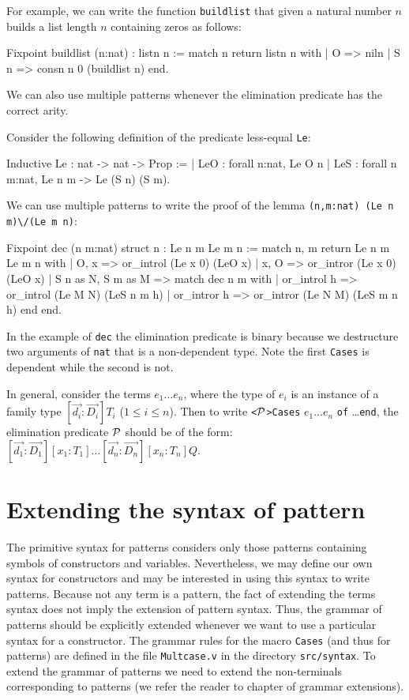 For example, we can write 
the function \verb+buildlist+ that given a natural number
$n$ builds a list length $n$ containing zeros as follows:

\begin{coq_example}
Fixpoint buildlist (n:nat) : listn n :=
  match n return listn n with
  | O => niln
  | S n => consn n 0 (buildlist n)
  end.
\end{coq_example}

We can also use multiple patterns whenever the elimination predicate has
the correct arity. 

Consider the following definition of the predicate less-equal
\verb+Le+:

\begin{coq_example}
Inductive Le : nat -> nat -> Prop :=
  | LeO : forall n:nat, Le O n
  | LeS : forall n m:nat, Le n m -> Le (S n) (S m).
\end{coq_example}

We can use multiple patterns to write  the proof of the lemma
 \verb+(n,m:nat) (Le n m)\/(Le m n)+:

\begin{coq_example}
Fixpoint dec (n m:nat) {struct n} : Le n m \/ Le m n :=
  match n, m return Le n m \/ Le m n with
  | O, x => or_introl (Le x 0) (LeO x)
  | x, O => or_intror (Le x 0) (LeO x)
  | S n as N, S m as M =>
      match dec n m with
      | or_introl h => or_introl (Le M N) (LeS n m h)
      | or_intror h => or_intror (Le N M) (LeS m n h)
      end
  end.
\end{coq_example}
In the example of \verb+dec+ the elimination predicate is binary
because we destructure two arguments of \verb+nat+ that is a
non-dependent type. Note the first \verb+Cases+ is dependent while the
second  is not.

In general, consider the terms $e_1\ldots e_n$,
where  the type of $e_i$ is an instance of a family type
$[\vec{d_i}:\vec{D_i}]T_i$  ($1\leq i
\leq n$). Then to  write \verb+<+${\cal P}$\verb+>Cases+  $e_1\ldots
e_n$ \verb+of+ \ldots \verb+end+, the 
elimination predicate ${\cal P}$ should be of the form:
$[\vec{d_1}:\vec{D_1}][x_1:T_1]\ldots [\vec{d_n}:\vec{D_n}][x_n:T_n]Q.$




\section{Extending the syntax of pattern}
The primitive syntax for patterns considers only those patterns containing
symbols of constructors and variables. Nevertheless, we
may define our own syntax for  constructors and may be interested in
using this syntax to write patterns. 
Because not  any term is a pattern, the fact of extending the terms
syntax does not imply the extension of pattern syntax. Thus,  
the grammar of patterns should be explicitly extended whenever we
want to use a particular syntax for a constructor.
The grammar rules for the macro  \verb+Cases+ (and thus for patterns)
are defined in the file \verb+Multcase.v+ in the directory
\verb+src/syntax+. To extend the grammar of patterns 
we need to extend the non-terminals corresponding to patterns
(we refer the reader to chapter of grammar extensions).

